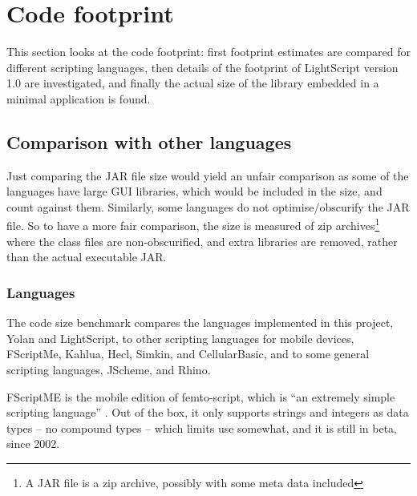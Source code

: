 \documentclass[11pt]{report}
\begin{document}
\section{Code footprint}
This section looks at the code footprint: first footprint estimates are compared for different scripting languages, then details of the footprint of LightScript version 1.0 are investigated, and finally the actual size of the library embedded in a minimal application is found.

\subsection{Comparison with other languages}
Just comparing the JAR file size would yield an unfair comparison as some of the languages have large GUI libraries, which would be included in the size, and count against them.
Similarly, some languages do not optimise/obscurify the JAR file.
So to have a more fair comparison, the size is measured of zip archives\footnote{A JAR file is a zip archive, possibly with some meta data included} where the class files are non-obscurified, and extra libraries are removed, rather than the actual executable JAR.



\subsubsection{Languages}
\label{codefootprint-languages}
The code size benchmark compares the languages implemented in this project, Yolan and LightScript, to other scripting languages for mobile devices, FScriptMe, Kahlua, Hecl, Simkin, and CellularBasic, and to some general scripting languages,  JScheme, and Rhino.

FScriptME is the mobile edition of femto-script, which is ``an extremely simple scripting language'' \cite{fscript}. 
Out of the box, it only supports strings and integers as data types -- no compound types -- which limits use somewhat, and it is still in beta, since 2002. 
\end{document}

